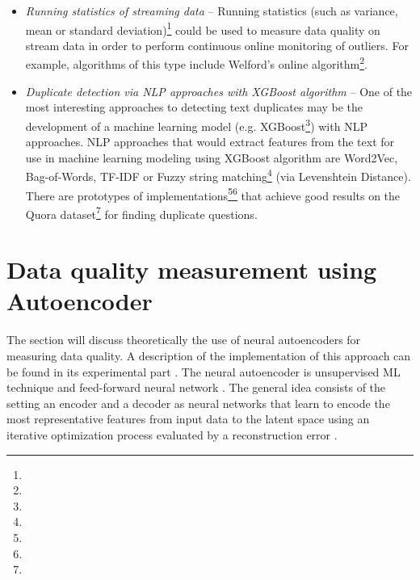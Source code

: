 \begin{itemize}
				\item \emph{Running statistics of streaming data}  -- Running statistics (such as variance, mean or standard deviation)\footnote{} could be used to measure data quality on stream data in order to perform continuous online monitoring of outliers. For example, algorithms of this type include Welford's online algorithm\footnote{}.
				\item \emph{Duplicate detection via NLP approaches with XGBoost algorithm} -- One of the most interesting approaches to detecting text duplicates may be the development of a machine learning model (e.g. XGBoost\footnote{}) with NLP approaches. NLP approaches that would extract features from the text for use in machine learning modeling using XGBoost algorithm are Word2Vec, Bag-of-Words, TF-IDF or Fuzzy string matching\footnote{} (via Levenshtein Distance). There are prototypes of implementations\footnote{}\footnote{} that achieve good results on the Quora dataset\footnote{} for finding duplicate questions.
			\end{itemize}		
																	
	\section{Data quality measurement using Autoencoder}
	\label{sec:data_quality_measurement_using_autoencoder}
	
		The section will discuss theoretically the use of neural autoencoders for measuring data quality. A description of the implementation of this approach can be found in its experimental part . The neural autoencoder is unsupervised ML technique and feed-forward neural network \cite{Purkait2019}. The general idea consists of the setting an encoder and a decoder as neural networks that learn to encode the most representative features from input data to the latent space using an iterative optimization process evaluated by a reconstruction error \cite{Rocca2019}\cite{Purkait2019}.
		
